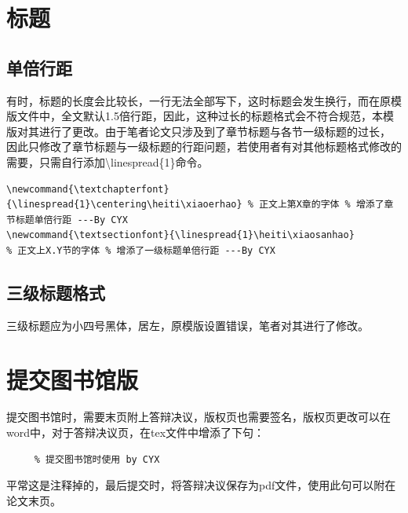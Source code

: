 \section{标题}
\subsection{单倍行距}
有时，标题的长度会比较长，一行无法全部写下，这时标题会发生换行，而在原模版文件中，全文默认1.5倍行距，因此，这种过长的标题格式会不符合规范，本模版对其进行了更改。由于笔者论文只涉及到了章节标题与各节一级标题的过长，
因此只修改了章节标题与一级标题的行距问题，若使用者有对其他标题格式修改的需要，只需自行添加\textbackslash{}linespread\{1\}命令。
\begin{lstlisting}
\newcommand{\textchapterfont}{\linespread{1}\centering\heiti\xiaoerhao} % 正文上第X章的字体 % 增添了章节标题单倍行距 ---By CYX
\newcommand{\textsectionfont}{\linespread{1}\heiti\xiaosanhao}            % 正文上X.Y节的字体 % 增添了一级标题单倍行距 ---By CYX
\end{lstlisting}
\subsection{三级标题格式}
三级标题应为小四号黑体，居左，原模版设置错误，笔者对其进行了修改。

\section{提交图书馆版}
提交图书馆时，需要末页附上答辩决议，版权页也需要签名，版权页更改可以在word中，对于答辩决议页，在tex文件中增添了下句：
\begin{lstlisting}
     % 提交图书馆时使用 by CYX
\end{lstlisting}

平常这是注释掉的，最后提交时，将答辩决议保存为pdf文件，使用此句可以附在论文末页。
